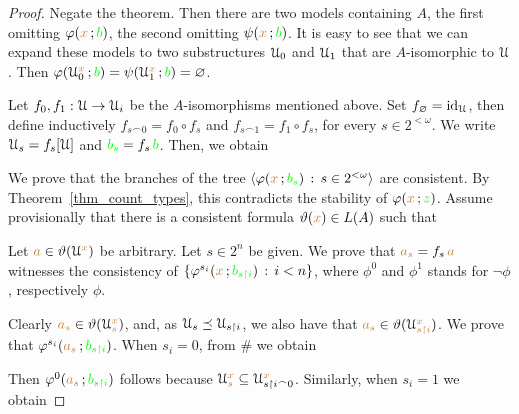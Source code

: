 \begin{proof}
  Negate the theorem.
  Then there are two models containing $A$, the first omitting $\varphi({\color{brown} x}\,;{\color{green} b})$, the second omitting $\psi({\color{brown} x}\,;{\color{green} b})$.
  It is easy to see that we can expand these models to two substructures $\EuScript U_0$ and $\EuScript U_1$ that are $A$-isomorphic to $\EuScript U$.
  Then $\varphi(\EuScript U_0^{{\color{brown} x}}\,;{\color{green} b})=\psi(\EuScript U_1^{{\color{brown} x}}\,;{\color{green} b})=\varnothing$.

  Let $f_0, f_1:\EuScript U\to\EuScript U_i$ be the $A$-isomorphisms mentioned above. 
  Set $f_\varnothing={\rm id}_\EuScript U$, then define inductively $f_{s\frown 0}=f_0\circ f_s$ and $f_{s\frown 1}=f_1\circ f_s$, for every $s\in 2^{<\omega}$.
  We write $\EuScript U_s=f_s[\EuScript U]$ and ${\color{green} b_s}=f_s\,{\color{green} b}$.
  Then, we obtain

    
  We prove that the branches of the tree $\langle\varphi({\color{brown} x}\,;{\color{green} b_s})\, :\,  s\in2^{<\omega}\rangle$ are consistent. 
  By Theorem~\ref{thm_count_types}, this contradicts the stability of $\varphi({\color{brown} x}\,;{\color{green} z})$.
  Assume provisionally that there is a consistent formula $\vartheta({\color{brown} x})\in L(A)$ such that
  
  
  Let ${\color{brown} a}\in\vartheta(\EuScript U^{\color{brown} x})$ be arbitrary.
  Let $s\in2^n$ be given.
  We prove that ${\color{brown} a_s}=f_s\,{\color{brown} a}$ witnesses the consistency of $\{\varphi^{s_i}({\color{brown} x}\,;{\color{green} b_{s\restriction i}})\, :\,i<n\}$, where $\phi^0$ and $\phi^1$ stands for $\neg\phi$, respectively $\phi$.

  Clearly ${\color{brown} a_s}\in\vartheta(\EuScript U_s^{\color{brown} x})$, and, as $\EuScript U_s\preceq\EuScript U_{s\restriction i}$, we also have that ${\color{brown} a_s}\in\vartheta(\EuScript U_{s\restriction i}^{\color{brown} x})$.
  We prove that $\varphi^{s_i}({\color{brown} a_s}\,;{\color{green} b_{s\restriction i}})$.
  When $s_i=0$, from \# we obtain
  
  
  
  Then $\varphi^0({\color{brown} a_s}\,;{\color{green} b_{s\restriction i}})$ follows because $\EuScript U_s^{\color{brown} x}\subseteq\EuScript U_{s\restriction i^\frown0}^{{\color{brown} x}}$.
  Similarly, when $s_i=1$ we obtain
  
  
  

\end{proof}
